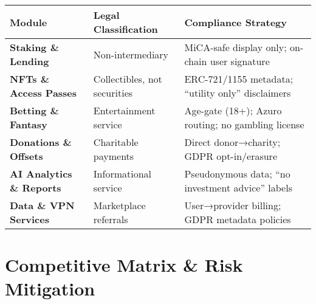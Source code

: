 \documentclass[13pt]{extarticle}
\begin{document}
\renewcommand{\arraystretch}{1.5}
\begin{table}[H]
  \centering
  \begin{tabular}{>{\bfseries}p{3.8cm} p{4.5cm} p{6cm}}
    \toprule
    \textbf{Module}          & \textbf{Legal Classification} & \textbf{Compliance Strategy} \\
    \midrule
    Staking \& Lending       & Non-intermediary              & MiCA-safe display only; on-chain user signature \\
    NFTs \& Access Passes    & Collectibles, not securities  & ERC-721/1155 metadata; “utility only” disclaimers \\
    Betting \& Fantasy       & Entertainment service         & Age-gate (18+); Azuro routing; no gambling license \\
    Donations \& Offsets     & Charitable payments           & Direct donor→charity; GDPR opt-in/erasure \\
    AI Analytics \& Reports  & Informational service         & Pseudonymous data; “no investment advice” labels \\
    Data \& VPN Services     & Marketplace referrals         & User→provider billing; GDPR metadata policies \\
    \bottomrule
  \end{tabular}
\end{table}


\newpage
\section{Competitive Matrix \& Risk Mitigation}
\end{document}
